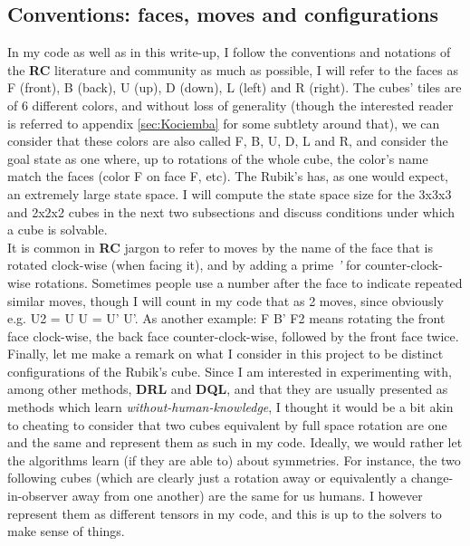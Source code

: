 \subsection{Conventions: faces, moves and configurations}
In my code as well as in this write-up, I follow the conventions and notations of the \textbf{RC} literature and community as much as possible, I will refer to the faces as F (front), B (back), U (up), D (down), L (left) and R (right). The cubes' tiles are of 6 different colors, and without loss of generality (though the interested reader is referred to appendix \ref{sec:Kociemba} for some subtlety around that), we can consider that these colors are also called F, B, U, D, L and R, and consider the goal state as one where, up to rotations of the whole cube, the color's name match the faces (color F on face F, etc). The Rubik's has, as one would expect, an extremely large state space. I will compute the state space size for the 3x3x3 and 2x2x2 cubes in the next two subsections and discuss conditions under which  a cube is solvable.
\\
It is common in \textbf{RC} jargon to refer to moves  by the name of the face that is rotated clock-wise (when facing it), and by adding a prime \textit{'} for counter-clock-wise rotations. Sometimes people use a number after the face to indicate repeated similar moves, though I will count in my code that as 2 moves, since obviously e.g. U2 = U U = U' U'. As another example: F B' F2 means rotating the front face clock-wise, the back face counter-clock-wise, followed by the front face twice.
\\
Finally, let me make a remark on what I consider in this project to be distinct configurations of the Rubik's cube. Since I am interested in experimenting with, among other methods, \textbf{DRL} and \textbf{DQL}, and that they are usually presented as methods which learn \textit{without-human-knowledge}, I thought it would be a bit akin to cheating to consider that two cubes equivalent by full space rotation are one and the same and represent them as such in my code. Ideally, we would rather let the algorithms learn (if they are able to) about symmetries. For instance, the two following cubes (which are clearly just a rotation away or equivalently a change-in-observer away from one another) are the same for us humans. I however represent them as different tensors in my code, and this is up to the solvers to make sense of things.


